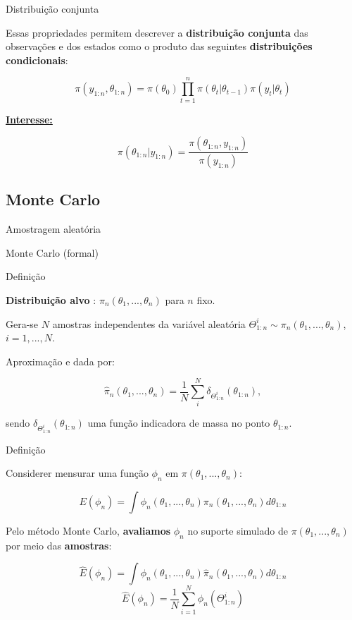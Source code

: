 \documentclass{beamer}
\begin{document}
\begin{frame}{Distribuição conjunta}

Essas propriedades permitem descrever a \textbf{distribuição conjunta} das observações e dos estados como o produto das seguintes \textbf{distribuições condicionais}:

$$
\pi(y_{1:n},\theta_{1:n}) = \pi(\theta_0) \prod_{t=1}^n \pi(\theta_t|\theta_{t-1})\pi(y_t|\theta_t) 
$$

\underline{\textbf{Interesse:}}

$$\pi(\theta_{1:n}|y_{1:n}) =  \frac{\pi(\theta_{1:n},y_{1:n})}{\pi(y_{1:n})} $$


\end{frame}




\subsection{Monte Carlo}

\begin{frame}{Amostragem aleatória}

    \begin{block}{}
      \Huge  Monte Carlo (formal)
    \end{block}


\end{frame}

\begin{frame}{Definição}

\textbf{Distribuição alvo} : $\pi_n(\theta_1,...,\theta_n)$ para $n$ fixo.

\pause
\vspace{0.5cm}

Gera-se $N$ amostras independentes da variável aleatória $\Theta^i_{1:n} \sim \pi_n(\theta_1,...,\theta_n)$, $i=1,...,N$.

\pause
\vspace{0.5cm}

Aproximação e dada por:

$$
\hat{\pi}_n(\theta_1,...,\theta_n) = \frac{1}{N}\sum_i^N \delta_{\Theta^i_{1:n}}(\theta_{1:n}),
$$

\vspace{0.5cm}
sendo $\delta_{\Theta_{1:n}^{i}}(\theta_{1:n})$ uma função indicadora de massa no ponto $\theta_{1:n}$.
\end{frame}



\begin{frame}{Definição}

Considerer mensurar uma função $\phi_n$ em $\pi(\theta_1,...,\theta_n)$:

$$
E(\phi_n) =  \int \phi_n(\theta_1,...,\theta_n)\pi_n(\theta_1,...,\theta_n)d\theta_{1:n}
$$
\pause

Pelo método Monte Carlo, \textbf{avaliamos}  $\phi_n$ no suporte simulado de $\pi(\theta_1,...,\theta_n)$ por meio das \textbf{amostras}:

$$
\hat{E}(\phi_n) = \int \phi_n(\theta_1,...,\theta_n)\hat{\pi}_n(\theta_1,...,\theta_n)d\theta_{1:n}
$$
\pause
$$
\hat{E}(\phi_n) = \frac{1}{N} \sum_{i=1}^N \phi_n(\Theta^i_{1:n})
$$


\end{frame}
\end{document}
